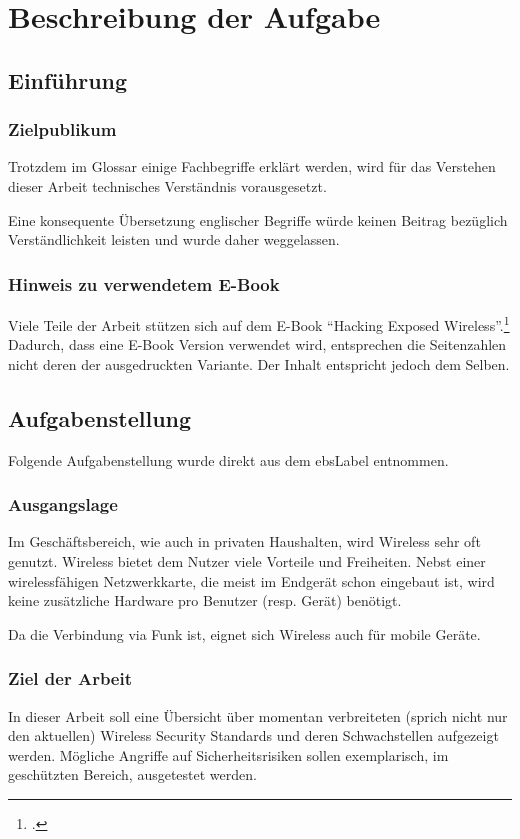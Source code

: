 \chapter{Beschreibung der Aufgabe}

\section{Einführung}
\subsection{Zielpublikum}
Trotzdem im Glossar einige Fachbegriffe erklärt werden, wird für das Verstehen dieser Arbeit technisches Verständnis vorausgesetzt.

Eine konsequente Übersetzung englischer Begriffe würde keinen Beitrag bezüglich Verständlichkeit leisten und wurde daher weggelassen.

\subsection{Hinweis zu verwendetem E-Book}
Viele Teile der Arbeit stützen sich auf dem E-Book "`Hacking Exposed Wireless"'.\footcite{WrightCache201503}
Dadurch, dass eine E-Book Version verwendet wird, entsprechen die Seitenzahlen nicht deren der ausgedruckten Variante.
Der Inhalt entspricht jedoch dem Selben.


\section{Aufgabenstellung}
Folgende Aufgabenstellung wurde direkt aus dem \gls{ebsLabel} entnommen.

\subsection{Ausgangslage}
Im Geschäftsbereich, wie auch in privaten Haushalten, wird Wireless sehr oft genutzt.
Wireless bietet dem Nutzer viele Vorteile und Freiheiten. Nebst einer wirelessfähigen Netzwerkkarte, die meist im Endgerät schon eingebaut ist, wird keine zusätzliche Hardware pro Benutzer (resp. Gerät) benötigt.

Da die Verbindung via Funk ist, eignet sich Wireless auch für mobile Geräte.

\subsection{Ziel der Arbeit}
In dieser Arbeit soll eine Übersicht über momentan verbreiteten (sprich nicht nur den aktuellen) Wireless Security Standards und deren Schwachstellen aufgezeigt werden.
Mögliche Angriffe auf Sicherheitsrisiken sollen exemplarisch, im geschützten Bereich, ausgetestet werden.

